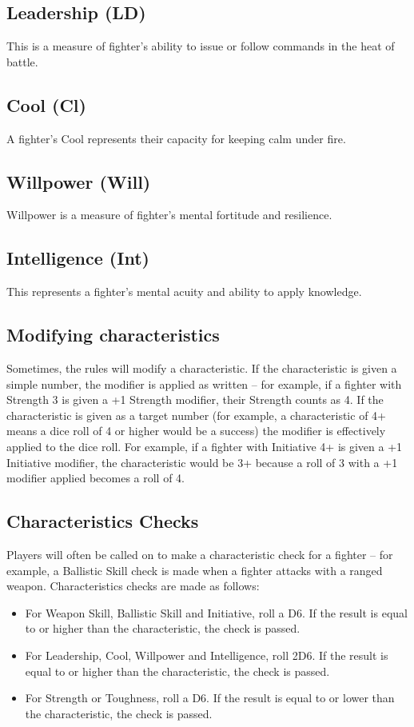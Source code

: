 \begin{multicols}{2}
\subsection{Leadership (LD)}
This is a measure of fighter’s ability to issue or follow commands in the heat of battle.

\subsection{Cool (Cl)}
A fighter’s Cool represents their capacity for keeping calm under fire.

\subsection{Willpower (Will)}
Willpower is a measure of fighter’s mental fortitude and resilience.

\subsection{Intelligence (Int)}
This represents a fighter’s mental acuity and ability to apply knowledge.

\subsection{Modifying characteristics}
Sometimes, the rules will modify a characteristic.
If the characteristic is given a simple number, the modifier is applied as written – for example, if a fighter with Strength 3 is given a +1 Strength modifier, their Strength counts as 4.
If the characteristic is given as a target number (for example, a characteristic of 4+ means a dice roll of 4 or
higher would be a success) the modifier is effectively applied to the dice roll. For example, if a fighter with Initiative 4+ is given a +1 Initiative modifier, the characteristic would be 3+ because a roll of 3 with a +1 modifier applied becomes a roll of 4.


\subsection{Characteristics Checks}
Players will often be called on to make a characteristic
check for a fighter – for example, a Ballistic Skill check is
made when a fighter attacks with a ranged weapon.
Characteristics checks are made as follows:
\begin{itemize}
  \item For Weapon Skill, Ballistic Skill and Initiative, roll a
  D6. If the result is equal to or higher than the
  characteristic, the check is passed.
  \item For Leadership, Cool, Willpower and Intelligence,
  roll 2D6. If the result is equal to or higher than the
  characteristic, the check is passed.
  \item For Strength or Toughness, roll a D6. If the result is
  equal to or lower than the characteristic, the check
  is passed.
\end{itemize}

\end{multicols}

